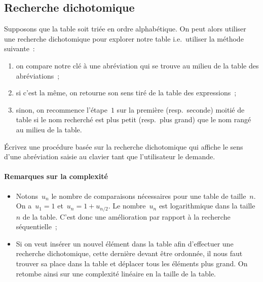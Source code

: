 \subsection{Recherche dichotomique}
\label{sec:RechercheDichotomique}
Supposons  que la table soit  tri\'ee en ordre alphab\'etique. On peut
alors utiliser une   recherche dichotomique pour  explorer notre table
i.e.\ utiliser la m\'ethode suivante~:
\begin{enumerate}
\item on compare  notre cl\'e \`a une abr\'eviation  qui se trouve au
  milieu de la table des abr\'eviations~;
\item si c'est la m\^eme, on retourne son  sens tir\'e de la table des
  expressions~;
\item   sinon, on recommence l'\'etape~$1$  sur  la premi\`ere (resp.\ 
  seconde) moiti\'e  de table  si  le nom  recherch\'e est  plus petit
  (resp.\ plus grand) que le nom rang\'e au milieu de la table.
\end{enumerate}
\begin{exercice}
  \'Ecrivez une proc\'edure bas\'ee  sur la recherche dichotomique qui
  affiche le  sens d'une   abr\'eviation  saisie au clavier   tant que
  l'utilisateur le demande.
  \ifcorrection
  \begin{correction}
    
  \end{correction}
  \fi
\end{exercice}
\paragraph{Remarques sur la complexit\'e}
\begin{itemize}
\item Notons~$u_{n}$ le nombre de  comparaisons n\'ecessaires pour une
  table   de taille~$n$.  On  a~${u_{1}=1}$ et~${u_{n}=1+u_{n/2}}$. Le
  nombre~$u_{n}$ est   logarithmique dans la  taille~$n$  de la table. 
  C'est donc   une   am\'elioration  par   rapport \`a    la recherche
  s\'equentielle~;
\item  Si on veut ins\'erer un  nouvel \'el\'ement  dans la table afin
  d'effectuer une   recherche dichotomique,  cette  derni\`ere  devant
  \^etre ordonn\'ee, il  nous faut trouver  sa place dans la table  et
  d\'eplacer tous les  \'el\'ements  plus grand. On retombe  ainsi sur
  une complexit\'e lin\'eaire en la taille de la table.
\end{itemize}

